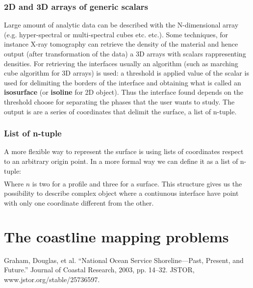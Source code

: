 \subsubsection*{2D and 3D arrays of generic scalars}
Large amount of analytic data can be described with the N-dimensional array (e.g. hyper-spectral or multi-spectral cubes etc. etc.). Some techniques, for instance X-ray tomography can retrieve the density of the material and hence output (after transformation of the data) a 3D arrays with scalars rappresenting densities. For retrieving the interfaces usually an algorithm (such as marching cube algorithm for 3D arrays) is used: a threshold is applied value of the scalar is used for delimiting the borders of the interface and obtaining what is called an \textbf{isosurface} (or \textbf{isoline} for 2D object). Thus the interface found depends on the threshold choose for separating the phases that the user wants to study. The output is are a series of coordinates that delimit the surface, a list of n-tuple.

\subsubsection*{List of n-tuple}
A more flexible way to represent the surface is using lists of coordinates respect to an arbitrary origin point. In a more formal way we can define it as a list of n-tuple:
 \begin{gather*}
  [(i_1, \ldots, i_n), \\
   \ldots , \\
  (i_1, \ldots, i_n)]   
 \end{gather*}
Where $n$ is two for a profile and three for a surface. This structure gives us the possibility to describe complex object where a contiunous interface have point with only one coordinate different from the other. 



\subsection{}

\section{The coastline mapping problems}
Graham, Douglas, et al. “National Ocean Service Shoreline—Past, Present, and Future.” Journal of Coastal Research, 2003, pp. 14–32. JSTOR, www.jstor.org/stable/25736597.

